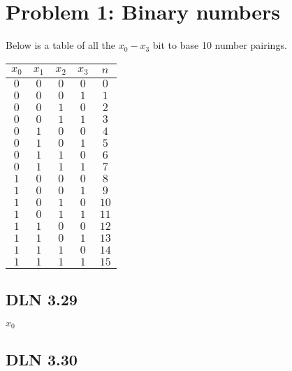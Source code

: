 \documentclass[titlepage]{article}
\begin{document}
 \maketitle

\section{Problem 1: Binary numbers}

Below is a table of all the \(x_0-x_3\) bit to base 10 number pairings.

\begin{center}
\begin{tabular}{c c c c|c}
\textbf{$x_0$} & \textbf{$x_1$} & \textbf{$x_2$} & \textbf{$x_3$} & \textbf{$n$} \\ \hline
\(0\) & \(0\) & \(0\) & \(0\) & \(0\)\\
\(0\) & \(0\) & \(0\) & \(1\) & \(1\)\\
\(0\) & \(0\) & \(1\) & \(0\) & \(2\)\\
\(0\) & \(0\) & \(1\) & \(1\) & \(3\)\\
\(0\) & \(1\) & \(0\) & \(0\) & \(4\)\\
\(0\) & \(1\) & \(0\) & \(1\) & \(5\)\\
\(0\) & \(1\) & \(1\) & \(0\) & \(6\)\\
\(0\) & \(1\) & \(1\) & \(1\) & \(7\)\\
\(1\) & \(0\) & \(0\) & \(0\) & \(8\)\\
\(1\) & \(0\) & \(0\) & \(1\) & \(9\)\\
\(1\) & \(0\) & \(1\) & \(0\) & \(10\)\\
\(1\) & \(0\) & \(1\) & \(1\) & \(11\)\\
\(1\) & \(1\) & \(0\) & \(0\) & \(12\)\\
\(1\) & \(1\) & \(0\) & \(1\) & \(13\)\\
\(1\) & \(1\) & \(1\) & \(0\) & \(14\)\\
\(1\) & \(1\) & \(1\) & \(1\) & \(15\)\\

\end{tabular}
\end{center}

\subsection{DLN 3.29}  %

$x_0$

\subsection{DLN 3.30} 
\end{document}
